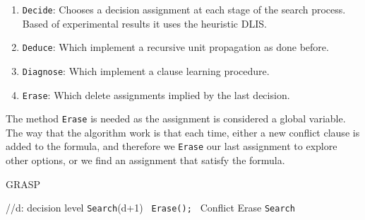 \begin{enumerate}
\item \texttt{Decide}: Chooses a decision assignment at each stage of the search process. Based of experimental results it uses the heuristic DLIS.
\item \texttt{Deduce}: Which implement a recursive unit propagation as done before.
\item \texttt{Diagnose}: Which implement a clause learning procedure.
\item \texttt{Erase}: Which delete assignments implied by the last decision.
\end{enumerate}


The method \texttt{Erase} is needed as the assignment is considered a global variable. The way that the algorithm work is that each time, either a new conflict clause is added to the formula, and therefore we \texttt{Erase} our last assignment to explore other options, or we find an assignment that satisfy the formula.

\begin{algorithm}
  \caption{GRASP}\label{bt}
  \begin{algorithmic}[1]
    \State //d: decision level
     
    \EndIf
    \State \texttt{Search}(d+1)
    \EndIf
    \texttt{ Erase(); } \Return Conflict
    \EndIf
    \EndIf
    \State Erase
    \EndWhile
    \EndProcedure
    \State \Return \texttt{Search}
\end{algorithmic}
\end{algorithm}

